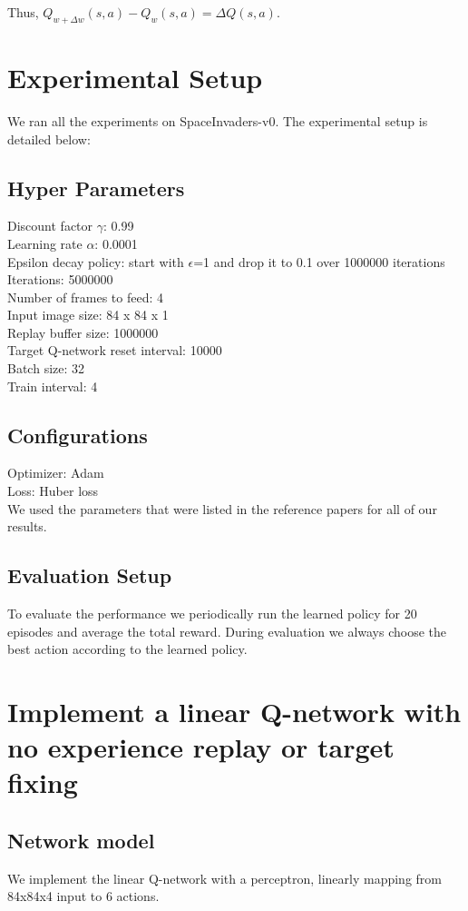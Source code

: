 \documentclass{article}
\begin{document}
Thus, $Q_{w+\Delta w}(s,a) - Q_{w}(s,a) = \Delta Q(s,a)$. 

\section*{Experimental Setup}
We ran all the experiments on SpaceInvaders-v0. The experimental setup is detailed below:

\subsection*{Hyper Parameters}
Discount factor $\gamma$: 0.99\\
Learning rate $\alpha$: 0.0001\\
Epsilon decay policy: start with $\epsilon$=1 and drop it to 0.1 over 1000000 iterations\\
Iterations: 5000000\\
Number of frames to feed: 4\\
Input image size: 84 x 84 x 1\\
Replay buffer size: 1000000\\
Target Q-network reset interval: 10000\\
Batch size: 32\\
Train interval: 4

\subsection*{Configurations}
Optimizer: Adam\\
Loss: Huber loss\\

We used the parameters that were listed in the reference papers for all of our results.

\subsection*{Evaluation Setup}
To evaluate the performance we periodically run the learned policy for 20 episodes and average the total reward. During evaluation we always choose the best action according to the learned policy.





\section*{Implement a linear Q-network with no experience replay or target fixing}
\subsection*{Network model}
We implement the linear Q-network with a perceptron, linearly mapping from 84x84x4 input to 6 actions.
\end{document}
